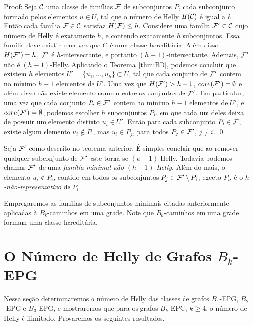 Proof: 
Seja ${\cal C}$ uma classe de famílias  ${\cal F}$ de subconjuntos $P$, cada subconjunto formado pelos elementos  $u \in U$, tal que o número de Helly $H({\cal C})$  é igual a $h$. Então cada família   ${\cal F} \in {\cal C}$ satisfaz $H({\cal F}) \leq h$. Considere uma família ${\cal F'} \in {\cal C}$  cujo número de Helly é  exatamente $h$, e contendo exatamente $h$ subconjuntos. Essa família deve existir uma vez que  ${\cal C}$ é uma classe hereditária. Além disso $H({\cal F'}) = h$, $\cal F'$ é $h$-intersectante, e portanto $(h-1)$-intersectante. Ademais, ${\cal F'}$ não é $(h-1)$-Helly. Aplicando o   Teorema~\ref{thm:BD}, podemos concluir que existem   $h$ elementos $U' = \{u_1, \ldots, u_h\} \subset U$, tal que cada conjunto de ${\cal F'}$ contem no mínimo $h-1$ elementos de $U'$. Uma vez que $H({\cal F'}) > h-1$, $core({\cal F'}) = \emptyset$ e além disso não existe elemento comum entre os conjuntos de $\cal F'$. Em particular, uma vez que cada conjunto $P_i \in {\cal F'}$ contem no mínimo  $h-1$ elementos de $U'$, e $core(\cal F') = \emptyset$, podemos escolher   $h$ subconjuntos $P_i$, em que cada um deles deixa de possuir um elemento distinto  $u_i \in U'$. Então para cada subconjunto  $P_i \in \cal F$, existe algum elemento $u_i \not \in P_i$, mas $u_i \in P_j$, para todos $P_j \in \cal F'$, $j \neq i$. \qed

Seja $\cal{ F'}$ como descrito no teorema anterior. É simples concluir que ao remover qualquer subconjunto de $\cal {F'}$ este torna-se $(h-1)$-Helly.  Todavia podemos chamar $\cal {F'}$ de uma {\it família minimal não}-$(h-1)$-{\it Helly}. Além do mais, o elemento $u_i \not \in P_i$, contido em todos os subconjuntos $P_j \in {\cal{F'}} \setminus P_i$, exceto $P_i$, é o {\it $h$-não-representativo} de $P_i$.  

Empregaremos as famílias de subconjuntos minimais citadas anteriormente, aplicadas à $B_k$-caminhos em uma grade. Note que $B_k$-caminhos em uma grade formam uma classe hereditária.

\section{O Número de Helly de Grafos $B_k$-EPG}\label{sec:Helly-number}

Nessa seção determinaremos o número de Helly das classes de grafos $B_1$-EPG, $B_2$-EPG e $B_3$-EPG, e mostraremos que para os grafos $B_k$-EPG, $k \geq 4$, o número de Helly é ilimitado. Provaremos os seguintes resultados.

